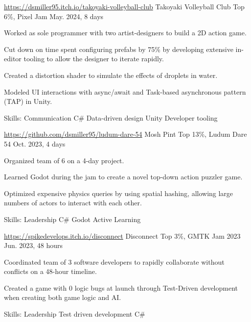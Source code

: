 \begin{cventries}
  \cventry
 {\href{https://dsmiller95.itch.io/takoyaki-volleyball-club}{https://dsmiller95.itch.io/takoyaki-volleyball-club}} %
 {Takoyaki Volleyball Club} %
 {Top 6\%, Pixel Jam} %
 {May. 2024, 8 days} %
 {
      \begin{cvitems} %
        \item {Worked as sole programmer with two artist-designers to build a 2D action game.}
        \item {Cut down on time spent configuring prefabs by 75\% by developing extensive in-editor tooling to allow the designer to iterate rapidly.}
        \item {Created a distortion shader to simulate the effects of droplets in water.}
        \item {Modeled UI interactions with async/await and Task-based asynchronous pattern (TAP) in Unity.}
        \item {Skills: Communication \textbullet{} C\# \textbullet{} Data-driven design \textbullet{} Unity \textbullet{} Developer tooling }
      \end{cvitems}
 }

  \cventry
 {\href{https://github.com/dsmiller95/ludum-dare-54}{https://github.com/dsmiller95/ludum-dare-54}} %
 {Mosh Pint} %
 {Top 13\%, Ludum Dare 54} %
 {Oct. 2023, 4 days} %
 {
      \begin{cvitems} %
        \item {Organized team of 6 on a 4-day project.}
        \item {Learned Godot during the jam to create a novel top-down action puzzler game.}
        \item {Optimized expensive physics queries by using spatial hashing, allowing large numbers of actors to interact with each other.}
        \item {Skills: Leadership \textbullet{} C\# \textbullet{} Godot \textbullet{} Active Learning}
      \end{cvitems}
 }

  \cventry
 {\href{https://spikedevelops.itch.io/disconnect}{https://spikedevelops.itch.io/disconnect}} %
 {Disconnect} %
 {Top 3\%, GMTK Jam 2023} %
 {Jun. 2023, 48 hours} %
 {
      \begin{cvitems} %
        \item {Coordinated team of 3 software developers to rapidly collaborate without conflicts on a 48-hour timeline.}
        \item {Created a game with 0 logic bugs at launch through Test-Driven development when creating both game logic and AI.}
        \item {Skills: Leadership \textbullet{} Test driven development \textbullet{} C\#}
      \end{cvitems}
 }


\end{cventries}
